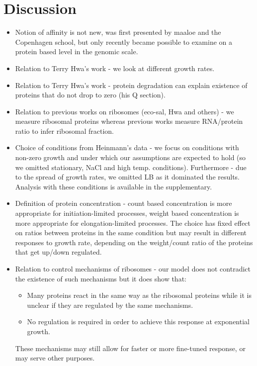 \documentclass[notitlepage]{article}
\begin{document}
\section{Discussion}
\begin{itemize}
\item 
Notion of affinity is not new, was first presented by maaloe and the Copenhagen school, but only recently became possible to examine on a protein based level in the genomic scale.
\item 
Relation to Terry Hwa's work - we look at different growth rates.
\item 
Relation to Terry Hwa's work - protein degradation can explain existence of proteins that do not drop to zero (his Q section).
\item 
Relation to previous works on ribosomes (eco-sal, Hwa and others) - we measure ribosomal proteins whereas previous works measure RNA/protein ratio to infer ribosomal fraction.
\item 
Choice of conditions from Heinmann's data - we focus on conditions with non-zero growth and under which our assumptions are expected to hold (so we omitted stationary, NaCl and high temp. conditions).
Furthermore - due to the spread of growth rates, we omitted LB as it dominated the results.
Analysis with these conditions is available in the supplementary.
\item
Definition of protein concentration - count based concentration is more appropriate for initiation-limited processes, weight based concentration is more appropriate for elongation-limited processes.
The choice has fixed effect on ratios between proteins in the same condition but may result in different responses to growth rate, depending on the weight/count ratio of the proteins that get up/down regulated.
\item 
Relation to control mechanisms of ribosomes - our model does not contradict the existence of such mechanisms but it does show that:
\begin{itemize}
\item 
Many proteins react in the same way as the ribosomal proteins while it is unclear if they are regulated by the same mechanisms.
\item 
No regulation is required in order to achieve this response at exponential growth.
\end{itemize}
These mechanisms may still allow for faster or more fine-tuned response, or may serve other purposes.
\end{itemize}
\end{document}
